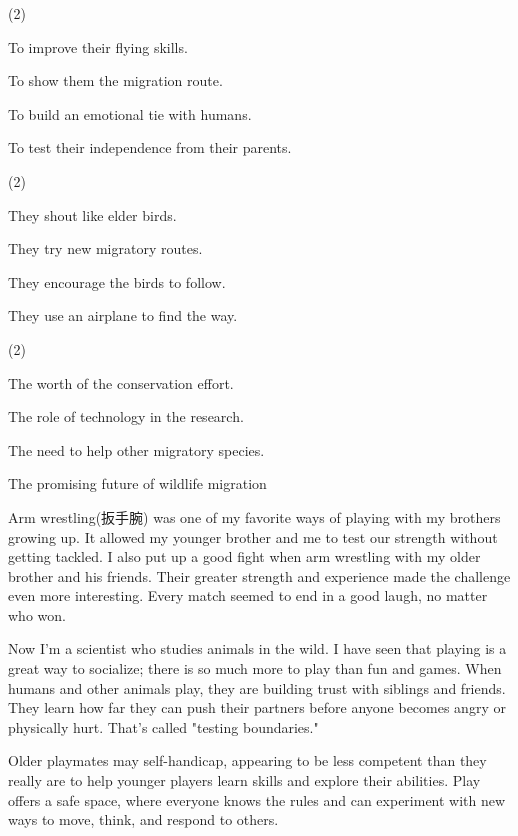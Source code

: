 \documentclass{英语试卷}
\begin{document}
\begin{choices}(2)
  \item To improve their flying skills.
  \item To show them the migration route.
  \item To build an emotional tie with humans.
  \item To test their independence from their parents.
\end{choices}
\begin{choices}(2)
  \item They shout like elder birds.
  \item They try new migratory routes.
  \item They encourage the birds to follow.
  \item They use an airplane to find the way.
\end{choices}
\begin{choices}(2)
  \item The worth of the conservation effort.
  \item The role of technology in the research.
  \item The need to help other migratory species.
  \item The promising future of wildlife migration
\end{choices}
\par Arm wrestling(扳手腕) was one of my favorite ways of playing with my brothers growing up. It allowed my younger brother and me to test our strength without getting tackled. I also put up a good fight when arm wrestling with my older brother and his friends. Their greater strength and experience made the challenge even more interesting. Every match seemed to end in a good laugh, no matter who won.\par
\par Now I'm a scientist who studies animals in the wild. I have seen that playing is a great way to socialize; there is so much more to play than fun and games. When humans and other animals play, they are building trust with siblings and friends. They learn how far they can push their partners before anyone becomes angry or physically hurt. That's called "testing boundaries."\par
\par Older playmates may self-handicap, appearing to be less competent than they really are to help younger players learn skills and explore their abilities. Play offers a safe space, where everyone knows the rules and can experiment with new ways to move, think, and respond to others.\par
\end{document}
